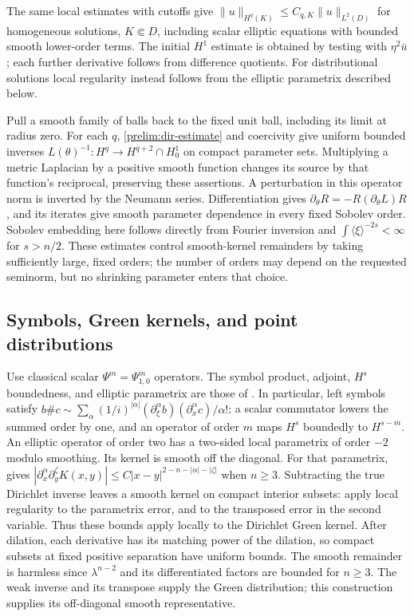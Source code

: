 The same local estimates with cutoffs give
$\|u\|_{H^q(K)}\le C_{q,K}\|u\|_{L^2(D)}$ for homogeneous solutions,
$K\Subset D$, including scalar elliptic equations with bounded smooth
lower-order terms. The initial $H^1$ estimate is obtained by testing with
$\eta^2\bar u$; each further derivative follows from difference quotients.
For distributional solutions local regularity instead follows from the
elliptic parametrix described below.

Pull a smooth family of balls back to the fixed unit ball, including its
limit at radius zero. For each $q$, \eqref{prelim:dir-estimate} and
coercivity give uniform bounded inverses
$L(\theta)^{-1}:H^q\to H^{q+2}\cap H^1_0$ on compact parameter sets.
Multiplying a metric Laplacian by a positive smooth function changes its
source by that function's reciprocal, preserving these assertions.
A perturbation in this operator norm is inverted by the Neumann series.
Differentiation gives
$\partial_\theta R=-R(\partial_\theta L)R$, and its iterates give smooth
parameter dependence in every fixed Sobolev order. Sobolev embedding here
follows directly from Fourier inversion and
$\int\langle\xi\rangle^{-2s}<\infty$ for $s>n/2$.
These estimates control smooth-kernel remainders by taking sufficiently
large, fixed orders; the number of orders may depend on the requested
seminorm, but no shrinking parameter enters that choice.

\subsection{Symbols, Green kernels, and point distributions}
Use classical scalar $\Psi^m=\Psi^m_{1,0}$ operators.
The symbol product, adjoint, $H^s$ boundedness, and elliptic parametrix
are those of \citep[Lecture~I, Sections~2--4 and~8]{TaylorPsido}.
In particular, left symbols satisfy
$b\#c\sim\sum_\alpha(1/i)^{|\alpha|}
 (\partial_\xi^\alpha b)(\partial_x^\alpha c)/\alpha!$;
a scalar commutator lowers the summed order by one, and an operator of
order $m$ maps $H^s$ boundedly to $H^{s-m}$.
An elliptic operator of order two has a two-sided local parametrix
of order $-2$ modulo smoothing. Its kernel is smooth off the diagonal.
For that parametrix, \citep[Lecture~I, (1.23)--(1.24)]{TaylorPsido}
gives $|\partial_x^\alpha\partial_y^\zeta K(x,y)|
 \le C|x-y|^{2-n-|\alpha|-|\zeta|}$ when $n\ge3$.
Subtracting the true Dirichlet inverse leaves a smooth kernel on compact
interior subsets: apply local regularity to the parametrix error, and
to the transposed error in the second variable. Thus these bounds apply
locally to the Dirichlet Green kernel. After dilation, each derivative
has its matching power of the dilation, so compact subsets at fixed
positive separation have uniform bounds. The smooth remainder is harmless
since $\lambda^{n-2}$ and its differentiated factors are bounded for
$n\ge3$. The weak inverse and its transpose supply the Green distribution;
this construction supplies its off-diagonal smooth representative.

